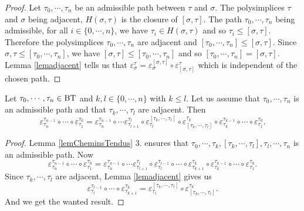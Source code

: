 \documentclass[a4paper,10pt]{amsart}
\begin{document}
\begin{proof}
Let $\tau_{0},\cdots,\tau_{n}$ be an admissible path between $\tau$ and $\sigma$. The polysimplices $\tau$ and $\sigma$ being adjacent, $H(\sigma,\tau)$ is the closure of $[\sigma,\tau]$. The path $\tau_{0},\cdots,\tau_{n}$ being admissible, for all $i \in \{0,\cdots,n\}$, we have $\tau_i \in H(\sigma,\tau)$ and so $\tau_i \leq [\sigma,\tau]$. Therefore the polysimplices  $\tau_{0},\cdots,\tau_{n}$ are adjacent and $[\tau_{0},\cdots,\tau_{n}] \leq [\sigma,\tau]$. Since $\sigma,\tau \leq [\tau_{0},\cdots,\tau_{n}]$, we have $[\sigma,\tau] \leq [\tau_{0},\cdots,\tau_{n}] $ and so $[\tau_{0},\cdots,\tau_{n}] = [\sigma,\tau]$. Lemma \ref{lemadjacent} tells us that $\varepsilon_{\sigma}^{\tau} = \varepsilon^{[\sigma,\tau]}_{\sigma} \circ \varepsilon_{[\sigma,\tau]}^{\tau}$ which is independent of the chosen path.
\end{proof}

\begin{Lem}
\label{lemsimpliepsilon}
Let $\tau_{0},\cdots,\tau_{n} \in \bt$ and $k,l \in \{0,\cdots,n\}$ with $k \leq l$. Let us assume that $\tau_{0},\cdots,\tau_{n}$ is an admissible path and that $\tau_{k},\cdots,\tau_{l}$ are adjacent. Then
\[\varepsilon^{\tau_{n-1}}_{\tau_{n}} \circ \cdots \circ \varepsilon_{\tau_{1}}^{\tau_{0}}=\varepsilon^{\tau_{n-1}}_{\tau_{n}} \circ \cdots \varepsilon^{\tau_{l}}_{\tau_{l+1}} \circ \varepsilon^{[\tau_{k},\cdots,\tau_{l}]}_{\tau_{l}} \circ\varepsilon^{\tau_{k}}_{[\tau_{k},\cdots,\tau_{l}]} \circ \varepsilon^{\tau_{k-1}}_{\tau_{k}} \circ \cdots \circ \varepsilon_{\tau_{1}}^{\tau_{0}}.\]
\end{Lem}

\begin{proof}
Lemma \ref{lemCheminsTendus} 3. ensures that $\tau_{0},\cdots,\tau_{k},[\tau_{k},\cdots,\tau_{l}],\tau_{l},\cdots,\tau_{n}$ is an admissible path. Now
\[\varepsilon^{\tau_{n-1}}_{\tau_{n}} \circ \cdots \circ \varepsilon_{\tau_{1}}^{\tau_{0}}=\varepsilon^{\tau_{n-1}}_{\tau_{n}} \circ \cdots \varepsilon^{\tau_{l}}_{\tau_{l+1}} \circ \varepsilon^{\tau_{l-1}}_{\tau_{l}} \circ \cdots \circ \varepsilon^{\tau_{k}}_{\tau_{k+1}} \circ \varepsilon^{\tau_{k-1}}_{\tau_{k}} \circ \cdots \circ \varepsilon_{\tau_{1}}^{\tau_{0}}.\]
Since $\tau_{k},\cdots,\tau_{l}$ are adjacent, Lemma \ref{lemadjacent} gives us
\[\varepsilon^{\tau_{l-1}}_{\tau_{l}} \circ \cdots \circ \varepsilon^{\tau_{k}}_{\tau_{k+1}} = \varepsilon^{[\tau_{k},\cdots,\tau_{l}]}_{\tau_{l}} \circ\varepsilon^{\tau_{k}}_{[\tau_{k},\cdots,\tau_{l}]}.\]
And we get the wanted result.
\end{proof}
\end{document}
